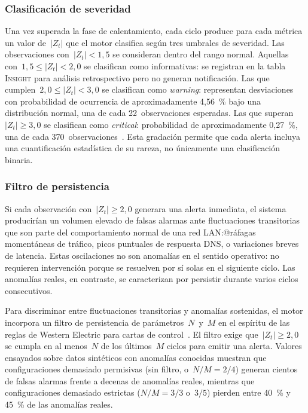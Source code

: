 \subsubsection{Clasificación de severidad}

Una vez superada la fase de calentamiento, cada ciclo produce para 
cada métrica un valor de~\(|Z_t|\) que el motor clasifica según tres 
umbrales de severidad. Las observaciones con~\(|Z_t| < 1{,}5\) se 
consideran dentro del rango normal. Aquellas con~\(1{,}5 \leq |Z_t| < 2{,}0\) 
se clasifican como informativas: se registran en la tabla 
\textsc{Insight} para análisis retrospectivo pero no generan 
notificación. Las que cumplen~\(2{,}0 \leq |Z_t| < 3{,}0\) se 
clasifican como \textit{warning}: representan desviaciones con 
probabilidad de ocurrencia de aproximadamente 4{,}56~\% bajo una 
distribución normal, una de cada 22~observaciones esperadas. Las 
que superan~\(|Z_t| \geq 3{,}0\) se clasifican como \textit{critical}: 
probabilidad de aproximadamente 0{,}27~\%, una de 
cada 370~observaciones~\cite{montgomery2013spc}. Esta gradación 
permite que cada alerta incluya una cuantificación estadística de su 
rareza, no únicamente una clasificación binaria.

\subsubsection{Filtro de persistencia}

Si cada observación con~\(|Z_t| \geq 2{,}0\) generara una alerta 
inmediata, el sistema producirían un volumen elevado de falsas 
alarmas ante fluctuaciones transitorias que son parte del 
comportamiento normal de una red LAN:@ráfagas momentáneas de 
tráfico, picos puntuales de respuesta DNS, o variaciones breves de 
latencia. Estas oscilaciones no son anomalías en el sentido 
operativo: no requieren intervención porque se resuelven por sí 
solas en el siguiente ciclo. Las anomalías reales, en contraste, se 
caracterizan por persistir durante varios ciclos consecutivos.

Para discriminar entre fluctuaciones transitorias y anomalías 
sostenidas, el motor incorpora un filtro de persistencia de 
parámetros~\(N\)~y~\(M\) en el espíritu de las reglas de Western 
Electric para cartas de control~\cite{montgomery2013spc}. El filtro 
exige que~\(|Z_t| \geq 2{,}0\) se cumpla en al menos~\(N\) de los 
últimos~\(M\) ciclos para emitir una alerta. Valores ensayados sobre 
datos sintéticos con anomalías conocidas muestran que configuraciones 
demasiado permisivas (sin filtro, o~\(N/M = 2/4\)) generan cientos 
de falsas alarmas frente a decenas de anomalías reales, mientras que 
configuraciones demasiado estrictas (\(N/M = 3/3\) o~\(3/5\)) pierden 
entre 40~\% y 45~\% de las anomalías reales.

